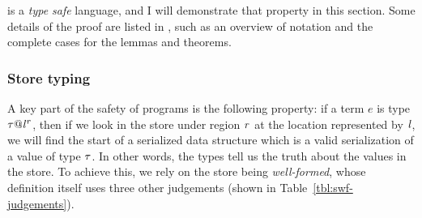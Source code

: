 
\ourcalc{} is a \emph{type safe} language, and I will demonstrate that property
in this section. Some details of the proof are listed in ,
such as an overview of notation and the complete cases for the lemmas and theorems.










\subsubsection{Store typing}
\label{sec:well-formedness}
A key part of the safety of \ourcalc{} programs is the following property: if a
term $e$ is type $\mathit{\tau} @ {\mathit{l}}^{\mathit{r}}$, then if we look in the store
under region $\mathit{r}$ at the location represented by $\mathit{l}$, we will find the
start of a serialized data structure which is a valid serialization of a value
of type $\mathit{\tau}$. In other words, the types tell us the truth about the values in
the store.
%
To achieve this, we rely on the store being \emph{well-formed}, whose definition
itself uses three other judgements (shown in Table~\ref{tbl:swf-judgements}).
%

